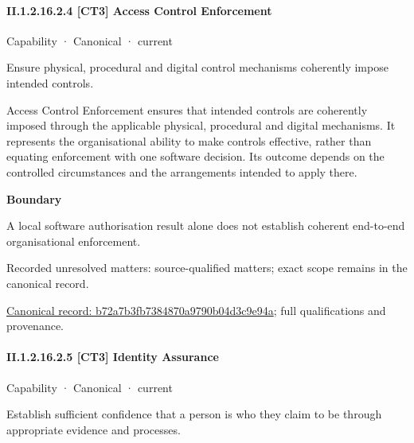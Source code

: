 \paragraph*{II.1.2.16.2.4 [CT3] Access Control Enforcement}
\label{navigation:II.1.2.16.2.4}

\label{element:b72a7b3fb7384870a9790b04d3c9e94a}
{\small Capability · Canonical · current}\par

Ensure physical, procedural and digital control mechanisms coherently impose intended controls.



Access Control Enforcement ensures that intended controls are coherently imposed through the applicable physical, procedural and digital mechanisms. It represents the organisational ability to make controls effective, rather than equating enforcement with one software decision. Its outcome depends on the controlled circumstances and the arrangements intended to apply there.



\textbf{Boundary}



A local software authorisation result alone does not establish coherent end-to-end organisational enforcement.


{\small Recorded unresolved matters: source-qualified matters; exact scope remains in the canonical record.}\par
{\footnotesize \href{../../../../../../../continuum/strategy/capability/b72a7b3fb7384870a9790b04d3c9e94a.md}{Canonical record: b72a7b3fb7384870a9790b04d3c9e94a}; full qualifications and provenance.}\par
\paragraph*{II.1.2.16.2.5 [CT3] Identity Assurance}
\label{navigation:II.1.2.16.2.5}

\label{element:56ccd6d3bf5b4ec980a333dfadf8d9fa}
{\small Capability · Canonical · current}\par

Establish sufficient confidence that a person is who they claim to be through appropriate evidence and processes.



